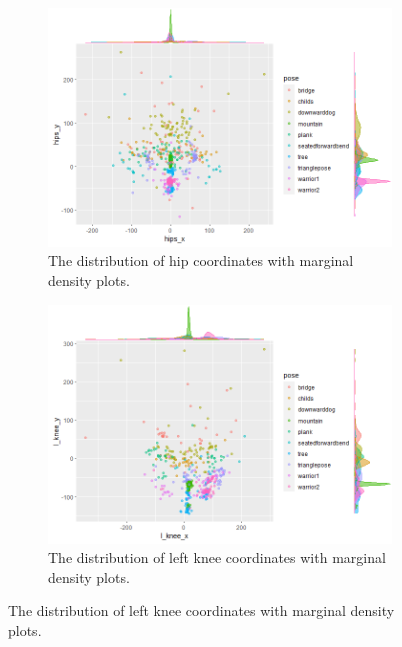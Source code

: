 \documentclass{article}
\begin{document}
\begin{figure}\ContinuedFloat
    \begin{subfigure}[b]{\linewidth}
        \includegraphics[width=0.9\linewidth]{limb-distribution/hips.png}
        \caption{The distribution of hip coordinates with marginal density plots.}
        \label{fig: hips}
    \end{subfigure}
    \begin{subfigure}[b]{\linewidth}
        \includegraphics[width=0.9\linewidth]{limb-distribution/l_knee.png}
        \caption{The distribution of left knee coordinates with marginal density plots.}
        \label{fig: l_knee}
    \end{subfigure}
\end{figure}
\end{document}
